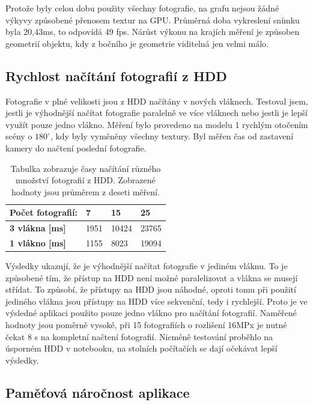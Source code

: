 \documentclass[11pt,twoside,a4paper]{book}
\begin{document}
Protože byly celou dobu použity všechny fotografie, na grafu nejsou žádné výkyvy způsobené přenosem textur na GPU. Průměrná doba vykreslení snímku byla 20,43ms, to odpovídá 49 fps. Nárůst výkonu na krajích měření je způsoben geometrií objektu, kdy z bočního je geometrie viditelná jen velmi málo.

\subsection{Rychlost načítání fotografií z HDD}

Fotografie v plné velikosti jsou z HDD načítány v nových vláknech. Testoval jsem, jestli je výhodnější načítat fotografie paralelně ve více vláknech nebo jestli je lepší využít pouze jedno vlákno. Měření bylo provedeno na modelu 1 rychlým otočením scény o $180^{\circ}$, kdy byly vyměněny všechny textury. Byl měřen čas od zastavení kamery do načtení poslední fotografie.

\begin{table}[ht]
\begin{center}
%
\begin{tabularx}{\textwidth}{ |l|R|R|R| }
\hline
\textbf{Počet fotografií:}  & \textbf{7} & \textbf{15} & \textbf{25} \\ \hline
\textbf{3 vlákna [ms]} & 1951 & 10424 & 23765  \\ \hline
\textbf{1 vlákno  [ms]} & 1155 & 8023 & 19094  \\ \hline
\end{tabularx}
\caption{Tabulka zobrazuje časy načítání různého množství fotografií z HDD. Zobrazené hodnoty jsou průměrem z deseti měření.}
\label{tab:test-6}
\end{center}
\end{table}

Výsledky ukazují, že je výhodnější načítat fotografie v jediném vláknu. To je způsobené tím, že přístup na HDD není možné paralelizovat a vlákna se musejí střídat. To způsobí, že přístupy na HDD jsou náhodné, oproti tomu při použití jediného vlákna jsou přístupy na HDD více sekvenční, tedy i rychlejší. Proto je ve výsledné aplikaci použito pouze jedno vlákno pro načítání fotografií. Naměřené hodnoty jsou poměrně vysoké, při 15 fotografiích o rozlišení 16MPx je nutné čekat 8 s na kompletní načtení fotografií. Nicméně testování proběhlo na úsporném HDD v notebooku, na stolních počítačích se dají očekávat lepší výsledky.


\subsection{Paměťová náročnost aplikace}
\end{document}
